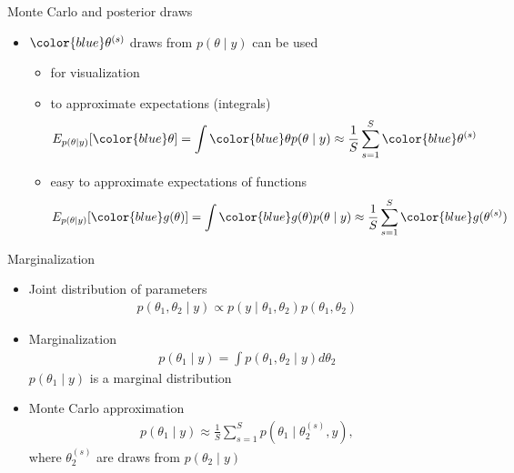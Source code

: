 \documentclass[finnish,english,t]{beamer}
\begin{document}
\begin{frame}{Monte Carlo and posterior draws}
  
  \begin{itemize}
  \item ${\color{blue}\theta^{(s)}}$ draws from $p(\theta \mid y)$ can be used
    \begin{itemize}
    \item<1-> for visualization
    \item<2-> to approximate expectations (integrals)
      \begin{align*}
        E_{p(\theta \mid y)}[{\color{blue}\theta}] = \int {\color{blue}\theta} p(\theta \mid y) \approx \frac{1}{S}\sum_{s=1}^{S} {\color{blue}\theta^{(s)}}
      \end{align*}
    \item<3-> easy to approximate expectations of functions
      \begin{align*}
        E_{p(\theta \mid y)}[{\color{blue}g(\theta)}] = \int {\color{blue}g(\theta)} p(\theta \mid y) \approx \frac{1}{S}\sum_{s=1}^{S} {\color{blue}g(\theta^{(s)})}
      \end{align*}
    \end{itemize}
  \end{itemize}

\end{frame}

\begin{frame}{Marginalization}

  \begin{itemize}
  \item<+-> Joint distribution of parameters
    \begin{align*}
      p(\theta_1,\theta_2 \mid y) \propto p(y \mid \theta_1,\theta_2)p(\theta_1,\theta_2)
    \end{align*}
  \item<+-> Marginalization
      \begin{align*}
        p(\theta_1 \mid y) = \int p(\theta_1,\theta_2 \mid y) d\theta_2
      \end{align*}
      $p(\theta_1 \mid y)$ is a marginal distribution
       \vspace{0.5\baselineskip}
    \item<+-> Monte Carlo approximation
          \begin{align*}
      p(\theta_1 \mid y) \approx  \frac{1}{S}\sum_{s=1}^{S} p(\theta_1 \mid \theta_2^{(s)}, y),
    \end{align*}
    where $\theta_2^{(s)}$ are draws from $p(\theta_2 \mid y)$
  \end{itemize}

\end{frame}
\end{document}
